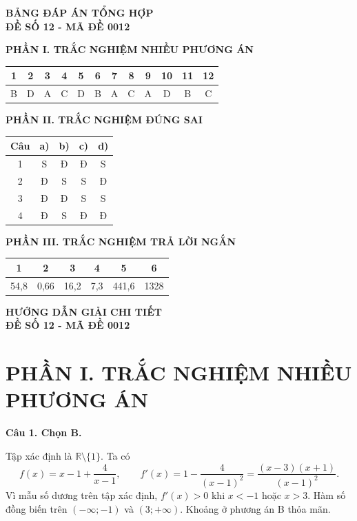 \documentclass[12pt,a4paper]{article}
\newcommand{\loigiai}[1]{\par\medskip\Needspace{4\baselineskip}\noindent\textbf{#1}\par\nobreak}
\begin{document}
\newpage
\begin{center}
{\Large\textbf{BẢNG ĐÁP ÁN TỔNG HỢP}}\\[4pt]
\textbf{ĐỀ SỐ 12 - MÃ ĐỀ 0012}
\end{center}
\medskip
\textbf{PHẦN I. TRẮC NGHIỆM NHIỀU PHƯƠNG ÁN}
\begin{center}\renewcommand{\arraystretch}{1.5}
\begin{tabular}{|*{12}{c|}}\hline
1 & 2 & 3 & 4 & 5 & 6 & 7 & 8 & 9 & 10 & 11 & 12\\\hline
B & D & A & C & D & B & A & C & A & D & B & C\\\hline
\end{tabular}\end{center}
\medskip
\textbf{PHẦN II. TRẮC NGHIỆM ĐÚNG SAI}
\begin{center}\renewcommand{\arraystretch}{1.5}
\begin{tabular}{|c|c|c|c|c|}\hline
Câu & a) & b) & c) & d)\\\hline
1 & S & Đ & Đ & S\\\hline
2 & Đ & S & S & Đ\\\hline
3 & Đ & Đ & S & S\\\hline
4 & Đ & S & Đ & Đ\\\hline
\end{tabular}\end{center}
\medskip
\textbf{PHẦN III. TRẮC NGHIỆM TRẢ LỜI NGẮN}
\begin{center}\renewcommand{\arraystretch}{1.5}
\begin{tabular}{|c|c|c|c|c|c|}\hline
1 & 2 & 3 & 4 & 5 & 6\\\hline
54,8 & 0,66 & 16,2 & 7,3 & 441,6 & 1328\\\hline
\end{tabular}\end{center}

\newpage
\begin{center}
{\Large\textbf{HƯỚNG DẪN GIẢI CHI TIẾT}}\\[4pt]
\textbf{ĐỀ SỐ 12 - MÃ ĐỀ 0012}
\end{center}
\section*{\large PHẦN I. TRẮC NGHIỆM NHIỀU PHƯƠNG ÁN}
\loigiai{Câu 1. Chọn B.}
Tập xác định là $\mathbb R\setminus\{1\}$. Ta có
\[
f(x)=x-1+\frac4{x-1},\qquad
f'(x)=1-\frac4{(x-1)^2}=\frac{(x-3)(x+1)}{(x-1)^2}.
\]
Vì mẫu số dương trên tập xác định, $f'(x)>0$ khi $x<-1$ hoặc $x>3$. Hàm số đồng biến trên $(-\infty;-1)$ và $(3;+\infty)$. Khoảng ở phương án B thỏa mãn.
\end{document}
